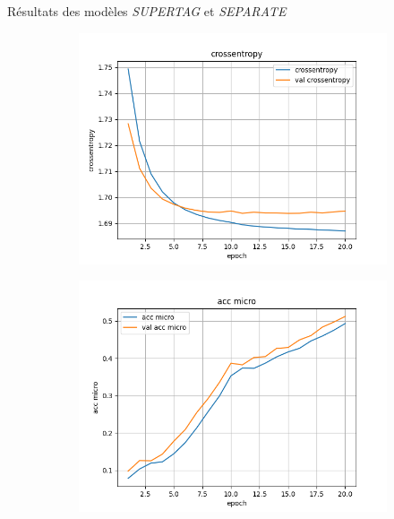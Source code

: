 \documentclass[11pt]{beamer}
\begin{document}
\begin{frame}{Résultats des modèles \textit{SUPERTAG} et \textit{SEPARATE}}
    \begin{figure}
        \centering
        \begin{subfigure}{0.32\textwidth}
            \centering
            \includegraphics[width=\linewidth]{../logs/supertag/crossentropy.png}
        \end{subfigure}
        \begin{subfigure}{0.32\textwidth}
            \centering
            \includegraphics[width=\linewidth]{../logs/supertag/acc micro.png}
        \end{subfigure}
        \begin{subfigure}{0.32\textwidth}

\end{subfigure}
\end{figure}
\end{frame}
\end{document}
